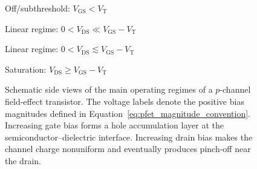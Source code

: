 \begin{figure}[htbp]
    \centering
    \begin{minipage}{0.48\textwidth}
        \centering
        \resizebox{\linewidth}{!}{}\par
        \vspace{0.4em}
        Off/subthreshold: $V_\mathrm{GS} < V_\mathrm{T}$
    \end{minipage}\hfill
    \begin{minipage}{0.48\textwidth}
        \centering
        \resizebox{\linewidth}{!}{}\par
        \vspace{0.4em}
        Linear regime: $0<V_\mathrm{DS}\ll V_\mathrm{GS} - V_\mathrm{T}$
    \end{minipage}

    \vspace{1em}

    \begin{minipage}{0.48\textwidth}
        \centering
        \resizebox{\linewidth}{!}{}\par
        \vspace{0.4em}
        Linear regime: $0<V_\mathrm{DS}\lesssim V_\mathrm{GS} - V_\mathrm{T}$
    \end{minipage}\hfill
    \begin{minipage}{0.48\textwidth}
        \centering
        \resizebox{\linewidth}{!}{}\par
        \vspace{0.4em}
        Saturation: $V_\mathrm{DS}\geq V_\mathrm{GS} - V_\mathrm{T}$
    \end{minipage}
    \caption[Operating regimes of a $p$-channel field-effect transistor]{Schematic
    side views of the main operating regimes of a $p$-channel field-effect
    transistor. The voltage labels denote the positive bias magnitudes defined in
    Equation~\ref{eq:pfet_magnitude_convention}. Increasing gate bias forms a hole
    accumulation layer at the semiconductor--dielectric interface. Increasing
    drain bias makes the channel charge nonuniform and eventually produces
    pinch-off near the drain.}
    \label{fig:fet_operation_modes}
\end{figure}

